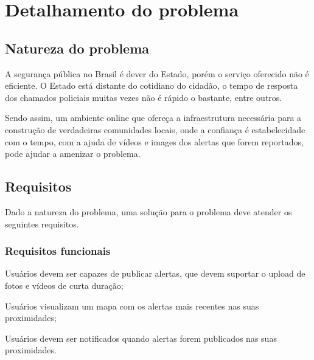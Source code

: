 \chapter{Detalhamento do problema}
\label{c.detalhamento-do-problema}


\section{Natureza do problema}
\label{s.natureza-do-problema}

A segurança pública no Brasil é dever do Estado, porém o serviço oferecido não é eficiente. O Estado está distante do cotidiano do cidadão, o tempo de resposta dos chamados policiais muitas vezes não é rápido o bastante, entre outros.

Sendo assim, um ambiente online que ofereça a infraestrutura necessária para a construção de verdadeiras comunidades locais, onde a confiança é estabelecidade com o tempo, com a ajuda de vídeos e images dos alertas que forem reportados, pode ajudar a amenizar o problema.

\section{Requisitos}
\label{s.requisitos}

Dado a natureza do problema, uma solução para o problema deve atender os seguintes requisitos.

\subsection{Requisitos funcionais}
\label{s.requisitos-funcionais}

\begin{alineas}
	\item Usuários devem ser capazes de publicar alertas, que devem suportar o upload de fotos e vídeos de curta duração;
 	\item Usuários visualizam um mapa com os alertas mais recentes nas suas proximidades;
	\item Usuários devem ser notificados quando alertas forem publicados nas suas proximidades.
\end{alineas}

